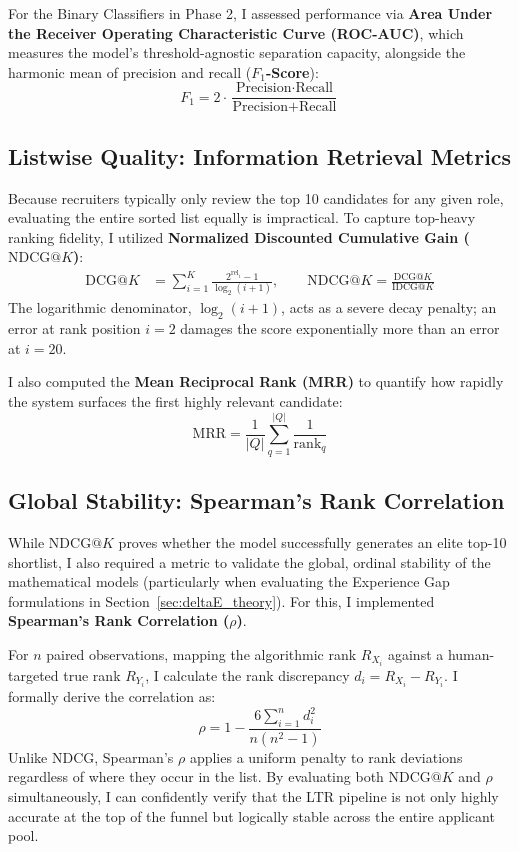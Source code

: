 For the Binary Classifiers in Phase 2, I assessed performance via \textbf{Area Under the Receiver Operating Characteristic Curve (ROC-AUC)}, which measures the model's threshold-agnostic separation capacity, alongside the harmonic mean of precision and recall (\textbf{$F_1$-Score}):
\begin{equation}
F_1 = 2 \cdot \frac{\text{Precision} \cdot \text{Recall}}{\text{Precision} + \text{Recall}}
\label{eq:eval_f1}
\end{equation}

\subsection{Listwise Quality: Information Retrieval Metrics}

Because recruiters typically only review the top 10 candidates for any given role, evaluating the entire sorted list equally is impractical. To capture top-heavy ranking fidelity, I utilized \textbf{Normalized Discounted Cumulative Gain ($\text{NDCG}@K$)}:
\begin{align}
\text{DCG}@K &= \sum_{i=1}^{K} \frac{2^{\text{rel}_i} - 1}{\log_2(i+1)}, \qquad
\text{NDCG}@K = \frac{\text{DCG}@K}{\text{IDCG}@K} \label{eq:eval_ndcg}
\end{align}
The logarithmic denominator, $\log_2(i+1)$, acts as a severe decay penalty; an error at rank position $i=2$ damages the score exponentially more than an error at $i=20$.

I also computed the \textbf{Mean Reciprocal Rank (MRR)} to quantify how rapidly the system surfaces the first highly relevant candidate:
\begin{equation}
\text{MRR} = \frac{1}{|Q|}\sum_{q=1}^{|Q|} \frac{1}{\text{rank}_q}
\label{eq:eval_mrr}
\end{equation}

\subsection{Global Stability: Spearman's Rank Correlation}

While $\text{NDCG}@K$ proves whether the model successfully generates an elite top-10 shortlist, I also required a metric to validate the global, ordinal stability of the mathematical models (particularly when evaluating the Experience Gap formulations in Section~\ref{sec:deltaE_theory}). For this, I implemented \textbf{Spearman's Rank Correlation ($\rho$)}.

For $n$ paired observations, mapping the algorithmic rank $R_{X_i}$ against a human-targeted true rank $R_{Y_i}$, I calculate the rank discrepancy $d_i = R_{X_i} - R_{Y_i}$. I formally derive the correlation as:
\begin{equation}
\rho = 1 - \frac{6\sum_{i=1}^{n} d_i^2}{n(n^2-1)}
\label{eq:eval_spearman}
\end{equation}
Unlike NDCG, Spearman's $\rho$ applies a uniform penalty to rank deviations regardless of where they occur in the list. By evaluating both $\text{NDCG}@K$ and $\rho$ simultaneously, I can confidently verify that the LTR pipeline is not only highly accurate at the top of the funnel but logically stable across the entire applicant pool.